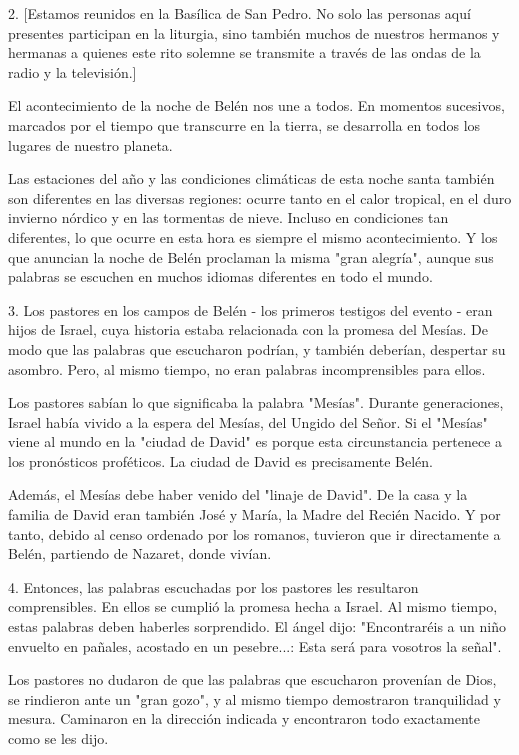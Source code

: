 2. {[}Estamos reunidos en la Basílica de San Pedro. No solo las personas
aquí presentes participan en la liturgia, sino también muchos de
nuestros hermanos y hermanas a quienes este rito solemne se transmite a
través de las ondas de la radio y la televisión.{]}

El acontecimiento de la noche de Belén nos une a todos. En momentos
sucesivos, marcados por el tiempo que transcurre en la tierra, se
desarrolla en todos los lugares de nuestro planeta.

Las estaciones del año y las condiciones climáticas de esta noche santa
también son diferentes en las diversas regiones: ocurre tanto en el
calor tropical, en el duro invierno nórdico y en las tormentas de nieve.
Incluso en condiciones tan diferentes, lo que ocurre en esta hora es
siempre el mismo acontecimiento. Y los que anuncian la noche de Belén
proclaman la misma "gran alegría", aunque sus palabras se escuchen en
muchos idiomas diferentes en todo el mundo.

3. Los pastores en los campos de Belén - los primeros testigos del
evento - eran hijos de Israel, cuya historia estaba relacionada con la
promesa del Mesías. De modo que las palabras que escucharon podrían, y
también deberían, despertar su asombro. Pero, al mismo tiempo, no eran
palabras incomprensibles para ellos.

Los pastores sabían lo que significaba la palabra "Mesías". Durante
generaciones, Israel había vivido a la espera del Mesías, del Ungido del
Señor. Si el "Mesías" viene al mundo en la "ciudad de David" es porque
esta circunstancia pertenece a los pronósticos proféticos. La ciudad de
David es precisamente Belén.

Además, el Mesías debe haber venido del "linaje de David". De la casa y
la familia de David eran también José y María, la Madre del Recién
Nacido. Y por tanto, debido al censo ordenado por los romanos, tuvieron
que ir directamente a Belén, partiendo de Nazaret, donde vivían.

4. Entonces, las palabras escuchadas por los pastores les resultaron
comprensibles. En ellos se cumplió la promesa hecha a Israel. Al mismo
tiempo, estas palabras deben haberles sorprendido. El ángel dijo:
"Encontraréis a un niño envuelto en pañales, acostado en un pesebre...:
Esta será para vosotros la señal".

Los pastores no dudaron de que las palabras que escucharon provenían de
Dios, se rindieron ante un "gran gozo", y al mismo tiempo demostraron
tranquilidad y mesura. Caminaron en la dirección indicada y encontraron
todo exactamente como se les dijo.

